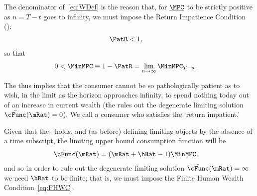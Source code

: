 \documentclass[ProjectDLO]{subfiles}
\begin{document}
The denominator of~\eqref{eq:WDef} is the reason that, for $\underbar{\MPC}$ to be strictly positive as $n=T-t$ goes to infinity, we must impose the Return Impatience Condition (\RIC):
\begin{align}
  \PatR  & < 1   \label{eq:RIC},
\end{align}
so that
\begin{align}
  0 <  \MinMPC  & \equiv   1-\PatR = \lim_{n \rightarrow \infty} \MinMPC_{T-n} \label{eq:MinMPCDef}
                  .
\end{align}

The {\RIC} thus implies that the consumer cannot be so pathologically patient as to wish, in the limit as the horizon approaches infinity, to spend nothing today out of an increase in current wealth (the {\RIC} rules out the degenerate limiting solution $\bar{\cFunc}(\mRat)=0$).  We call a consumer who satisfies the {\RIC} `return impatient.'

Given that the {\RIC}~holds, and (as before) defining limiting objects by the absence of a time subscript, the limiting upper bound consumption function will be
\begin{align}\label{eq:cFuncPFUnc}
  \bar{\cFunc}(\mRat)  & = (\mRat+\hRat-1)\MinMPC,
\end{align}
and so in order to rule out the degenerate limiting
solution $\bar{\cFunc}(\mRat) = \infty$ we need $\hRat$ to be finite; that is, we
must impose the Finite Human Wealth Condition~\eqref{eq:FHWC}.

\hypertarget{ValuePFAnalytical}{}
\hypertarget{Autarky-Value-PF}{}
\end{document}

